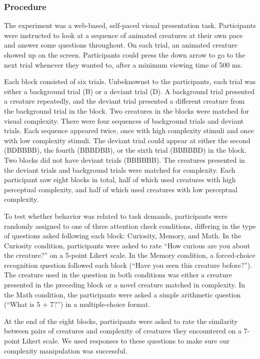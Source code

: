 \documentclass[10pt, letterpaper]{article}
\begin{document}
\hypertarget{procedure}{%
\subsubsection{Procedure}\label{procedure}}

The experiment was a web-based, self-paced visual presentation task.
Participants were instructed to look at a sequence of animated creatures
at their own pace and answer some questions throughout. On each trial,
an animated creature showed up on the screen. Participants could press
the down arrow to go to the next trial whenever they wanted to, after a
minimum viewing time of 500 ms.

Each block consisted of six trials. Unbeknownst to the participants,
each trial was either a background trial (B) or a deviant trial (D). A
background trial presented a creature repeatedly, and the deviant trial
presented a different creature from the background trial in the block.
Two creatures in the blocks were matched for visual complexity. There
were four sequences of background trials and deviant trials. Each
sequence appeared twice, once with high complexity stimuli and once with
low complexity stimuli. The deviant trial could appear at either the
second (BDBBBB), the fourth (BBBDBB), or the sixth trial (BBBBBD) in the
block. Two blocks did not have deviant trials (BBBBBB). The creatures
presented in the deviant trials and background trials were matched for
complexity. Each participant saw eight blocks in total, half of which
used creatures with high perceptual complexity, and half of which used
creatures with low perceptual complexity.

To test whether behavior was related to task demands, participants were
randomly assigned to one of three attention check conditions, differing
in the type of questions asked following each block: Curiosity, Memory,
and Math. In the Curiosity condition, participants were asked to rate
``How curious are you about the creature?'' on a 5-point Likert scale.
In the Memory condition, a forced-choice recognition question followed
each block (``Have you seen this creature before?''). The creature used
in the question in both conditions was either a creature presented in
the preceding block or a novel creature matched in complexity. In the
Math condition, the participants were asked a simple arithmetic question
(``What is 5 + 7?'') in a multiple-choice format.

At the end of the eight blocks, participants were asked to rate the
similarity between pairs of creatures and complexity of creatures they
encountered on a 7-point Likert scale. We used responses to these
questions to make sure our complexity manipulation was successful.
\end{document}
